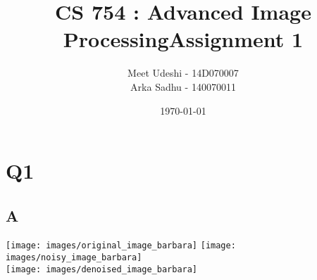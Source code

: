 \documentclass{article}
\title{CS 754 : Advanced Image ProcessingAssignment 1}
\author{Meet Udeshi - 14D070007\\
Arka Sadhu - 140070011\\
}
\date{\today}
\begin{document}
\maketitle
 
\section{Q1}
\subsection{A}
\texttt{[image: images/original\_image\_barbara]}
\texttt{[image: images/noisy\_image\_barbara]}\\
\texttt{[image: images/denoised\_image\_barbara]}\\
\end{document}

